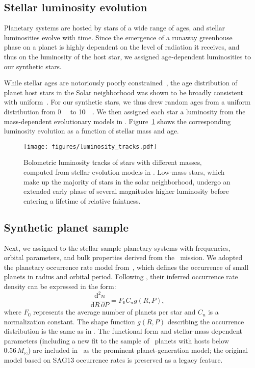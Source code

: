 \documentclass[twocolumn]{aastex631}
\begin{document}
\subsection{Stellar luminosity evolution}
Planetary systems are hosted by stars of a wide range of ages, and stellar luminosities evolve with time.
Since the emergence of a runaway greenhouse phase on a planet is highly dependent on the level of radiation it receives, and thus on the luminosity of the host star, we assigned age-dependent luminosities to our synthetic stars.

While stellar ages are notoriously poorly constrained~\cite[e.g.,][]{Adams2005}, the age distribution of planet host stars in the Solar neighborhood was shown to be broadly consistent with uniform~\citep{Reid2007,Gaidos2023}.
For our synthetic stars, we thus drew random ages from a uniform distribution from \SI{0}{\giga\year} to \SI{10}{\giga\year}.
We then assigned each star a luminosity from the mass-dependent evolutionary models in \citet{Baraffe1998}.
Figure~\ref{fig:luminosity_tracks} shows the corresponding luminosity evolution as a function of stellar mass and age.
\begin{figure}[ht!]
    \begin{centering}
        \texttt{[image: figures/luminosity\_tracks.pdf]}
        \caption{
            Bolometric luminosity tracks of stars with different masses, computed from stellar evolution models in \citet{Baraffe1998}.
            Low-mass stars, which make up the majority of stars in the solar neighborhood, undergo an extended early phase of several magnitudes higher luminosity before entering a lifetime of relative faintness.
        }
        \label{fig:luminosity_tracks}
    \end{centering}
\end{figure}


\subsection{Synthetic planet sample}\label{sec:syn_planets}
Next, we assigned to the stellar sample planetary systems with frequencies, orbital parameters, and bulk properties derived from the \kepler\ mission.
We adopted the planetary occurrence rate model from~\citet{Bergsten2022}, which defines the occurrence of small planets in radius and orbital period. Following \citet{Youdin2011a}, their inferred occurrence rate density can be expressed in the form:
\begin{equation}
    \frac{\mathrm{d}^2n}{\mathrm{d}R \, \partial P} = F_0 C_n g(R, P),
\end{equation}
where $F_0$ represents the average number of planets per star and $C_n$ is a normalization constant. The shape function $g(R,P)$ describing the occurrence distribution is the same as in \citet{Bergsten2022}. The functional form and stellar-mass dependent parameters (including a new fit to the sample of \kepler\ planets with hosts below $0.56\,M_{\odot}$) are included in \bioverse\ as the prominent planet-generation model; the original model based on SAG13 occurrence rates is preserved as a legacy feature.
\end{document}
